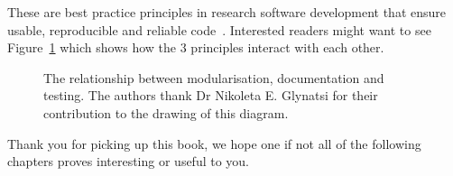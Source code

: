 These are best practice principles in research software
development that ensure usable, reproducible and reliable
code~\cite{wilson2014best}. Interested readers might want to see
Figure~\ref{fig:rsd-triangle} which shows how the 3 principles interact with
each other.

\begin{figure}
    \begin{center}
        
        \caption{The relationship between modularisation, documentation and
            testing. The authors thank Dr Nikoleta E. Glynatsi for their
            contribution to the drawing of this diagram.}
        \label{fig:rsd-triangle}
    \end{center}
\end{figure}

Thank you for picking up this book, we hope one if not all of the following
chapters proves interesting or useful to you.
